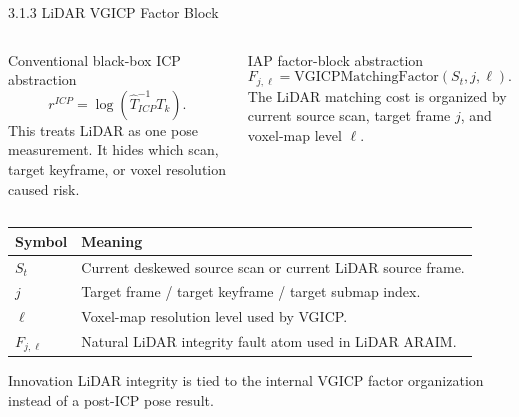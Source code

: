 \documentclass[10pt,aspectratio=169,xcolor=dvipsnames]{beamer}
\begin{document}
\begin{frame}{3.1.3 LiDAR VGICP Factor Block}
  \small
  \begin{columns}[T]
    \begin{block}{Conventional black-box ICP abstraction}
      \vspace{-4pt}
      \[
        r^{ICP}=\log\left(\hat{T}^{-1}_{ICP}T_k\right).
      \]
      \footnotesize This treats LiDAR as one pose measurement. It hides which scan, target keyframe, or voxel resolution caused risk.
    \end{block}

    \begin{exampleblock}{IAP factor-block abstraction}
      \vspace{-4pt}
      \[
        F_{j,\ell}=\mathrm{VGICPMatchingFactor}(S_t,j,\ell).
      \]
      \footnotesize The LiDAR matching cost is organized by current source scan, target frame $j$, and voxel-map level $\ell$.
    \end{exampleblock}
  \end{columns}

  \vspace{4pt}
  \begin{table}\scriptsize
    \begin{tabular}{p{} p{}}
      \toprule
      \textbf{Symbol} & \textbf{Meaning}\\
      \midrule
      $S_t$ & Current deskewed source scan or current LiDAR source frame.\\
      $j$ & Target frame / target keyframe / target submap index.\\
      $\ell$ & Voxel-map resolution level used by VGICP.\\
      $F_{j,\ell}$ & Natural LiDAR integrity fault atom used in LiDAR ARAIM.\\
      \bottomrule
    \end{tabular}
  \end{table}

  \begin{alertblock}{Innovation}
    \footnotesize LiDAR integrity is tied to the internal VGICP factor organization instead of a post-ICP pose result.
  \end{alertblock}
\end{frame}
\end{document}
